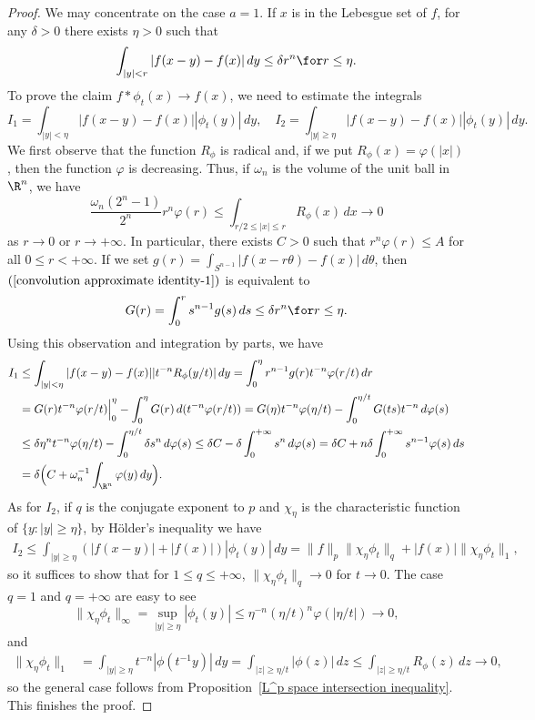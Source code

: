 \begin{proof}
We may concentrate on the case $a=1$. If $x$ is in the Lebesgue set of $f$, for any $\delta>0$ there exists $\eta>0$ such that
\begin{align}\label{convolution approximate identity-1}
\int_{|y|<r}|f(x-y)-f(x)|\,dy\leq\delta r^n\for r\leq\eta.
\end{align}
To prove the claim $f\ast\phi_t(x)\to f(x)$, we need to estimate the integrals
\[I_1=\int_{|y|<\eta}|f(x-y)-f(x)||\phi_t(y)|\,dy,\quad I_2=\int_{|y|\geq\eta}|f(x-y)-f(x)||\phi_t(y)|\,dy.\]
We first observe that the function $R_\phi$ is radical and, if we put $R_\phi(x)=\varphi(|x|)$, then the function $\varphi$ is decreasing. Thus, if $\omega_n$ is the volume of the unit ball in $\R^n$, we have
\[\frac{\omega_n(2^n-1)}{2^n}r^n\varphi(r)\leq\int_{r/2\leq|x|\leq r}R_\phi(x)\,dx\to 0\]
as $r\to 0$ or $r\to+\infty$. In particular, there exists $C>0$ such that $r^n\varphi(r)\leq A$ for all $0\leq r<+\infty$. If we set $g(r)=\int_{S^{n-1}}|f(x-r\theta)-f(x)|\,d\theta$, then $(\ref{convolution approximate identity-1})$ is equivalent to
\[G(r)=\int_{0}^{r}s^{n-1}g(s)\,ds\leq\delta r^n\for r\leq\eta.\]
Using this observation and integration by parts, we have
\begin{equation*}
\begin{aligned}
I_1&\leq\int_{|y|<\eta}|f(x-y)-f(x)||t^{-n}R_\phi(y/t)|\,dy=\int_{0}^{\eta}r^{n-1}g(r)t^{-n}\varphi(r/t)\,dr\\
&=G(r)t^{-n}\varphi(r/t)\Big|_0^{\eta}-\int_{0}^{\eta}G(r)\,d(t^{-n}\varphi(r/t))=G(\eta)t^{-n}\varphi(\eta/t)-\int_{0}^{\eta/t}G(ts)t^{-n}\,d\varphi(s)\\
&\leq\delta\eta^nt^{-n}\varphi(\eta/t)-\int_{0}^{\eta/t}\delta s^n\,d\varphi(s)\leq\delta C-\delta\int_{0}^{+\infty}s^n\,d\varphi(s)=\delta C+n\delta\int_{0}^{+\infty}s^{n-1}\varphi(s)\,ds\\
&=\delta\Big(C+\omega_n^{-1}\int_{\R^n}\varphi(y)\,dy\Big).
\end{aligned}
\end{equation*}
As for $I_2$, if $q$ is the conjugate exponent to $p$ and $\chi_\eta$ is the characteristic function of $\{y:|y|\geq\eta\}$, by H\"older's inequality we have
\begin{align*}
I_2\leq \int_{|y|\geq\eta}(|f(x-y)|+|f(x)|)|\phi_t(y)|\,dy=\|f\|_p\|\chi_\eta\phi_t\|_q+|f(x)|\|\chi_\eta\phi_t\|_1,
\end{align*}
so it suffices to show that for $1\leq q\leq +\infty$, $\|\chi_\eta\phi_t\|_q\to 0$ for $t\to 0$. The case $q=1$ and $q=+\infty$ are easy to see
\[\|\chi_\eta\phi_t\|_\infty=\sup_{|y|\geq\eta}|\phi_t(y)|\leq\eta^{-n}(\eta/t)^n\varphi(|\eta/t|)\to 0,\]
and
\begin{equation*}
\begin{aligned}
\|\chi_\eta\phi_t\|_1&=\int_{|y|\geq\eta}t^{-n}|\phi(t^{-1}y)|\,dy=\int_{|z|\geq\eta/t}|\phi(z)|\,dz\leq\int_{|z|\geq\eta/t}R_\phi(z)\,dz\to 0,
\end{aligned}
\end{equation*}
so the general case follows from Proposition~\ref{L^p space intersection inequality}. This finishes the proof.
\end{proof}

